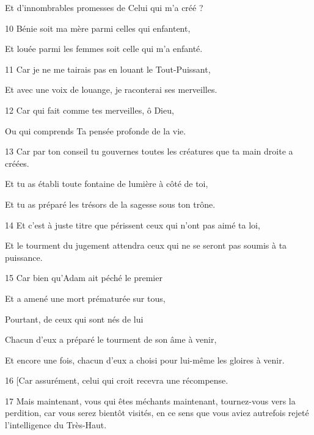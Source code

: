 \par Et d'innombrables promesses de Celui qui m'a créé ?

\par 10 Bénie soit ma mère parmi celles qui enfantent,

\par Et louée parmi les femmes soit celle qui m'a enfanté.

\par 11 Car je ne me tairais pas en louant le Tout-Puissant,

\par Et avec une voix de louange, je raconterai ses merveilles.

\par 12 Car qui fait comme tes merveilles, ô Dieu,

\par Ou qui comprends Ta pensée profonde de la vie.

\par 13 Car par ton conseil tu gouvernes toutes les créatures que ta main droite a créées.

\par Et tu as établi toute fontaine de lumière à côté de toi,

\par Et tu as préparé les trésors de la sagesse sous ton trône.

\par 14 Et c'est à juste titre que périssent ceux qui n'ont pas aimé ta loi,

\par Et le tourment du jugement attendra ceux qui ne se seront pas soumis à ta puissance.

\par 15 Car bien qu'Adam ait péché le premier

\par Et a amené une mort prématurée sur tous,

\par Pourtant, de ceux qui sont nés de lui

\par Chacun d'eux a préparé le tourment de son âme à venir,

\par Et encore une fois, chacun d'eux a choisi pour lui-même les gloires à venir.

\par 16 [Car assurément, celui qui croit recevra une récompense.

\par 17 Mais maintenant, vous qui êtes méchants maintenant, tournez-vous vers la perdition, car vous serez bientôt visités, en ce sens que vous aviez autrefois rejeté l'intelligence du Très-Haut.

